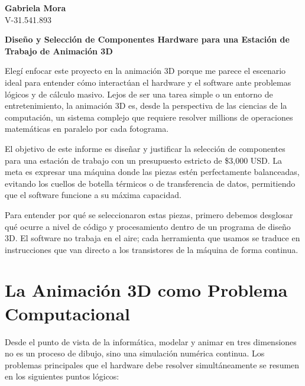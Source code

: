 \documentclass[14pt,a4paper]{extarticle}
\begin{document}
\begin{flushright}
    \textbf{Gabriela Mora} \\
    V-31.541.893
\end{flushright}

\vspace{0.5cm}

\begin{center}
    {\Large \textbf{Diseño y Selección de Componentes Hardware para una Estación de Trabajo de Animación 3D}} \\
    \vspace{0.3cm}
\end{center}

\vspace{0.4cm}

Elegí enfocar este proyecto en la animación 3D porque me parece el escenario ideal para entender cómo interactúan el hardware y el software ante problemas lógicos y de cálculo masivo. Lejos de ser una tarea simple o un entorno de entretenimiento, la animación 3D es, desde la perspectiva de las ciencias de la computación, un sistema complejo que requiere resolver millions de operaciones matemáticas en paralelo por cada fotograma. 

El objetivo de este informe es diseñar y justificar la selección de componentes para una estación de trabajo con un presupuesto estricto de \$3,000 USD. La meta es expresar una máquina donde las piezas estén perfectamente balanceadas, evitando los cuellos de botella térmicos o de transferencia de datos, permitiendo que el software funcione a su máxima capacidad. 

Para entender por qué se seleccionaron estas piezas, primero debemos desglosar qué ocurre a nivel de código y procesamiento dentro de un programa de diseño 3D. El software no trabaja en el aire; cada herramienta que usamos se traduce en instrucciones que van directo a los transistores de la máquina de forma continua.

\section*{\centering La Animación 3D como Problema Computacional}

Desde el punto de vista de la informática, modelar y animar en tres dimensiones no es un proceso de dibujo, sino una simulación numérica continua. Los problemas principales que el hardware debe resolver simultáneamente se resumen en los siguientes puntos lógicos:
\end{document}
